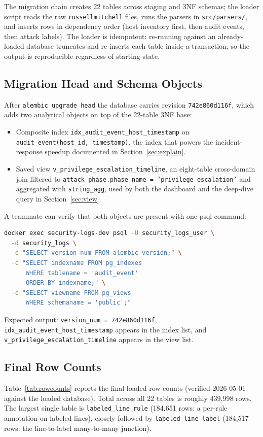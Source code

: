 The migration chain creates 22 tables across staging and 3NF schemas;
the loader script reads the raw \texttt{russellmitchell} files, runs
the parsers in \texttt{src/parsers/}, and inserts rows in dependency
order (host inventory first, then audit events, then attack labels).
The loader is idempotent: re-running against an already-loaded database
truncates and re-inserts each table inside a transaction, so the
output is reproducible regardless of starting state.

\subsection{Migration Head and Schema Objects}
After \texttt{alembic upgrade head} the database carries revision
\texttt{742e860d116f}, which adds two analytical objects on top of the
22-table 3NF base:
\begin{itemize}
  \item Composite index
    \texttt{idx\_audit\_event\_host\_timestamp} on
    \texttt{audit\_event(host\_id, timestamp)}, the index that powers
    the incident-response speedup documented in
    Section~\ref{sec:explain}.
  \item Saved view \texttt{v\_privilege\_escalation\_timeline}, an
    eight-table cross-domain join filtered to
    \texttt{attack\_phase.phase\_name = 'privilege\_escalation'} and
    aggregated with \texttt{string\_agg}, used by both the dashboard
    and the deep-dive query in Section~\ref{sec:view}.
\end{itemize}
A teammate can verify that both objects are present with one psql
command:

\begin{lstlisting}[language=bash, basicstyle=\ttfamily\small, frame=single]
docker exec security-logs-dev psql -U security_logs_user \
  -d security_logs \
  -c "SELECT version_num FROM alembic_version;" \
  -c "SELECT indexname FROM pg_indexes
      WHERE tablename = 'audit_event'
      ORDER BY indexname;" \
  -c "SELECT viewname FROM pg_views
      WHERE schemaname = 'public';"
\end{lstlisting}

Expected output: \texttt{version\_num = 742e860d116f},
\texttt{idx\_audit\_event\_host\_timestamp} appears in the index list,
and \texttt{v\_privilege\_escalation\_timeline} appears in the view
list.

\subsection{Final Row Counts}
Table~\ref{tab:rowcounts} reports the final loaded row counts (verified
2026-05-01 against the loaded database). Total across all 22 tables is
roughly 439{,}998 rows. The largest single table is
\texttt{labeled\_line\_rule} (184{,}651 rows: a per-rule annotation on
labeled lines), closely followed by \texttt{labeled\_line\_label}
(184{,}517 rows: the line-to-label many-to-many junction).

